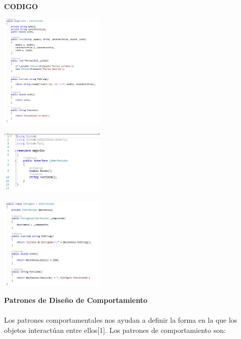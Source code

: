 \documentclass[twoside,twocolumn]{article}
\begin{document}
        
    \item \textbf{CODIGO}
    \begin{center}
        \includegraphics[width=5cm]{./img/Decorator1.jpg} 
    \end{center}
    \begin{center}
        \includegraphics[width=5cm]{./img/Decorator2.jpg} 
    \end{center}
    \begin{center}
        \includegraphics[width=5cm]{./img/Decorator3.jpg} 
    \end{center}

	
    \item \textbf{Patrones de Diseño de Comportamiento }
	\\
	\\Los patrones comportamentales nos ayudan a definir la forma en la que los objetos interactúan entre ellos[1]. Los patrones de comportamiento son:
    
\end{document}

